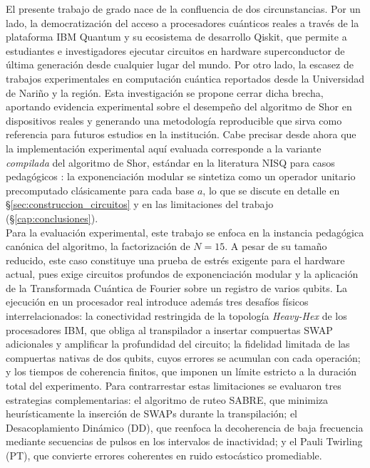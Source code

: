 \documentclass[12pt, spanish]{book}
\begin{document}
El presente trabajo de grado nace de la confluencia de dos circunstancias. Por un lado, la democratización del acceso a procesadores cuánticos reales a través de la plataforma IBM Quantum y su ecosistema de desarrollo Qiskit, que permite a estudiantes e investigadores ejecutar circuitos en hardware superconductor de última generación desde cualquier lugar del mundo. Por otro lado, la escasez de trabajos experimentales en computación cuántica reportados desde la Universidad de Nariño y la región. Esta investigación se propone cerrar dicha brecha, aportando evidencia experimental sobre el desempeño del algoritmo de Shor en dispositivos reales y generando una metodología reproducible que sirva como referencia para futuros estudios en la institución. Cabe precisar desde ahora que la implementación experimental aquí evaluada corresponde a la variante \emph{compilada} del algoritmo de Shor, estándar en la literatura NISQ para casos pedagógicos \cite{Skosana2021, Lanyon2007, smolin2013oversimplifying}: la exponenciación modular se sintetiza como un operador unitario precomputado clásicamente para cada base $a$, lo que se discute en detalle en §\ref{sec:construccion_circuitos} y en las limitaciones del trabajo (§\ref{cap:conclusiones}).\\

Para la evaluación experimental, este trabajo se enfoca en la instancia pedagógica canónica del algoritmo, la factorización de \(N = 15\). A pesar de su tamaño reducido, este caso constituye una prueba de estrés exigente para el hardware actual, pues exige circuitos profundos de exponenciación modular y la aplicación de la Transformada Cuántica de Fourier sobre un registro de varios qubits. La ejecución en un procesador real introduce además tres desafíos físicos interrelacionados: la conectividad restringida de la topología \textit{Heavy-Hex} de los procesadores IBM, que obliga al transpilador a insertar compuertas SWAP adicionales y amplificar la profundidad del circuito; la fidelidad limitada de las compuertas nativas de dos qubits, cuyos errores se acumulan con cada operación; y los tiempos de coherencia finitos, que imponen un límite estricto a la duración total del experimento. Para contrarrestar estas limitaciones se evaluaron tres estrategias complementarias: el algoritmo de ruteo SABRE, que minimiza heurísticamente la inserción de SWAPs durante la transpilación; el Desacoplamiento Dinámico (DD), que reenfoca la decoherencia de baja frecuencia mediante secuencias de pulsos en los intervalos de inactividad; y el Pauli Twirling (PT), que convierte errores coherentes en ruido estocástico promediable.\\
\end{document}
